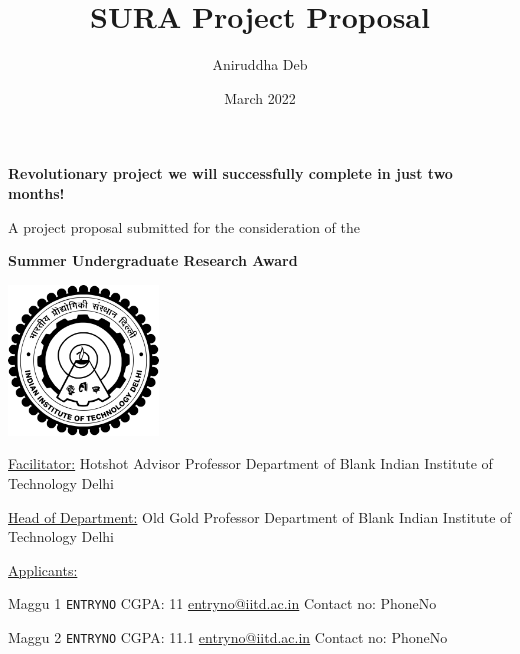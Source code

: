 \documentclass[12pt]{article}
\title{SURA Project Proposal}
\author{Aniruddha Deb}
\date{March 2022}
\begin{document}
\begin{titlepage}
  \begin{center}
    {\LARGE \textbf{Revolutionary project we will successfully complete in just two months!}}
        
    \vspace{1cm}
    A project proposal submitted for the consideration of the
    
    \vspace{0.4cm}
    {\Large \textbf{Summer Undergraduate Research Award}}
    
    \vspace{2cm}
    \includegraphics[width=0.3\textwidth]{iitd.png}
    
    \vspace{2cm}
    {\obeylines
    \underline{Facilitator:}
    \vspace{0.5em}
    Hotshot Advisor
    Professor
    Department of Blank
    Indian Institute of Technology Delhi}
    
    \vspace{0.7cm}
    {\obeylines
    \underline{Head of Department:}
    \vspace{0.5em}
    Old Gold
    Professor
    Department of Blank
    Indian Institute of Technology Delhi}
    
    \vspace{0.7cm}
    \underline{Applicants:}
    
    \begin{minipage}{0.4\textwidth}
    \vspace{0.5cm}
    \begin{flushleft}
      {\obeylines
      Maggu 1
      \texttt{ENTRYNO}
      CGPA: 11
      \href{mailto:entryno@iitd.ac.in}{entryno@iitd.ac.in}
      Contact no: PhoneNo}
    \end{flushleft}
    \end{minipage}%
    \begin{minipage}{0.4\textwidth}
    \vspace{0.5cm}
    \begin{flushright}
      {\obeylines
      Maggu 2
      \texttt{ENTRYNO}
      CGPA: 11.1
      \href{mailto:entryno@iitd.ac.in}{entryno@iitd.ac.in}
      Contact no: PhoneNo}
    \end{flushright}
    \end{minipage}
  \end{center}
\end{titlepage}
	
\end{document}
